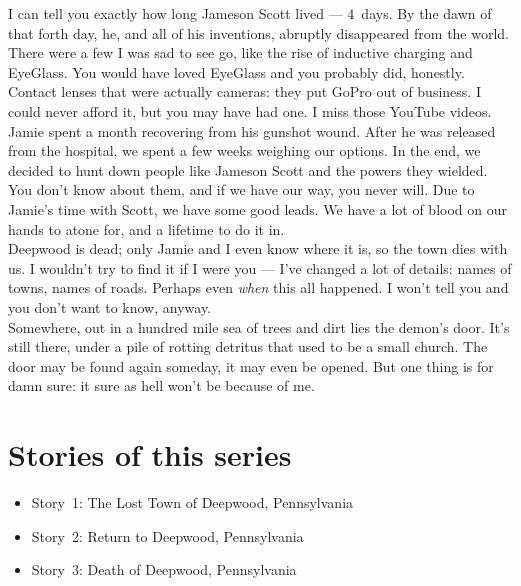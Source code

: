 \documentclass[a5paper]{scrartcl}
\begin{document}
I can tell you exactly how long Jameson Scott lived --- 4~days. By the dawn of that forth day, he, and all of his inventions, abruptly disappeared from the world. There were a few I was sad to see go, like the rise of inductive charging and EyeGlass. You would have loved EyeGlass and you probably did, honestly.  Contact lenses that were actually cameras: they put GoPro out of business. I could never afford it, but you may have had one. I miss those YouTube videos. \\


Jamie spent a month recovering from his gunshot wound. After he was released from the hospital, we spent a few weeks weighing our options. In the end, we decided to hunt down people like Jameson Scott and the powers they wielded. You don't know about them, and if we have our way, you never will. Due to Jamie's time with Scott, we have some good leads. We have a lot of blood on our hands to atone for, and a lifetime to do it in. \\


Deepwood is dead; only Jamie and I even know where it is, so the town dies with us. I wouldn't try to find it if I were you --- I've changed a lot of details: names of towns, names of roads. Perhaps even \textit{when}
 this all happened. I won't tell you and you don't want to know, anyway.\\


Somewhere, out in a hundred mile sea of trees and dirt lies the demon's door. It's still there, under a pile of rotting detritus that used to be a small church. The door may be found again someday, it may even be opened. But one thing is for damn sure: it sure as hell won't be because of me.

\clearpage
\section*{Stories of this series}

\begin{itemize}
    \item Story~1: The Lost Town of Deepwood, Pennsylvania
    \item Story~2: Return to Deepwood, Pennsylvania
    \item Story~3: Death of Deepwood, Pennsylvania
\end{itemize}
\end{document}

